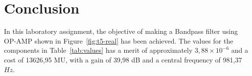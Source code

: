 \section{Conclusion}
\label{sec:conclusion}

In this laboratory assignment, the objective of making a Bandpass filter using OP-AMP shown in
Figure~\ref{fig:t5-real} has been achieved.
The values for the components in Table~\ref{tab:values} has a merit of approximately $3,88 \times 10^{-6}$
and a cost of 13626,95 MU, with a gain of 39,98 dB and a central frequency of 981,37 $Hz$.
